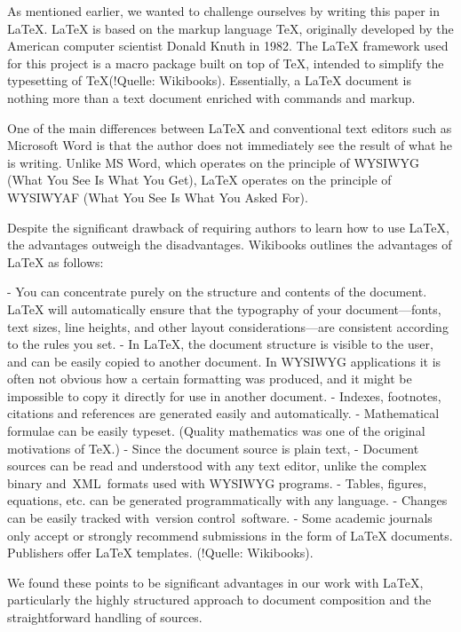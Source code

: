 As mentioned earlier, we wanted to challenge ourselves by writing this paper in \LaTeX{}. \LaTeX{} is based on the markup language TeX, originally developed by the American computer scientist Donald Knuth in 1982. The \LaTeX{} framework used for this project is \dq a macro package built on top of TeX\dq , intended to \dq simplify the typesetting of TeX\dq  (!Quelle: Wikibooks). Essentially, a \LaTeX{} document is nothing more than a text document enriched with commands and markup.

One of the main differences between \LaTeX{} and conventional text editors such as Microsoft Word is that the author does not immediately see the result of what he is writing. Unlike MS Word, which operates on the principle of WYSIWYG (What You See Is What You Get), \LaTeX{} operates on the principle of WYSIWYAF (What You See Is What You Asked For).

Despite the significant drawback of requiring authors to learn how to use \LaTeX{}, the advantages outweigh the disadvantages. Wikibooks outlines the advantages of \LaTeX{} as follows:

- You can concentrate purely on the structure and contents of the document. \LaTeX{} will automatically ensure that the typography of your document—fonts, text sizes, line heights, and other layout considerations—are consistent according to the rules you set.
- In \LaTeX{}, the document structure is visible to the user, and can be easily copied to another document. In WYSIWYG applications it is often not obvious how a certain formatting was produced, and it might be impossible to copy it directly for use in another document.
- Indexes, footnotes, citations and references are generated easily and automatically.
- Mathematical formulae can be easily typeset. (Quality mathematics was one of the original motivations of TeX.)
- Since the document source is plain text,
    - Document sources can be read and understood with any text editor, unlike the complex binary and XML formats used with WYSIWYG programs.
    - Tables, figures, equations, etc. can be generated programmatically with any language.
    - Changes can be easily tracked with version control software.
- Some academic journals only accept or strongly recommend submissions in the form of \LaTeX{} documents. Publishers offer \LaTeX{} templates.
(!Quelle: Wikibooks).

We found these points to be significant advantages in our work with \LaTeX{}, particularly the highly structured approach to document composition and the straightforward handling of sources.

